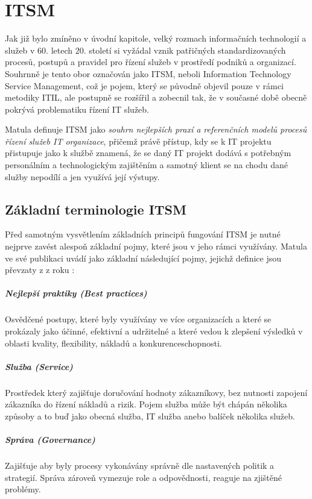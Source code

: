 \documentclass[
  digital,     %
  twoside,     %
  lof,         %
  lot,         %
]{fithesis4}
\begin{document}
\chapter{ITSM}
Jak již bylo zmíněno v úvodní kapitole, velký rozmach informačních technologií a služeb v 60. letech 20. století si vyžádal vznik patřičných standardizovaných procesů, postupů a pravidel pro řízení služeb v prostředí podniků a organizací. Souhrnně je tento obor označován jako ITSM, neboli Information Technology Service Management, což je pojem, který se původně objevil pouze v rámci metodiky ITIL, ale postupně se rozšířil a zobecnil tak, že v současné době obecně pokrývá problematiku řízení IT služeb.\parencite[s.~20]{Matula2017} 

Matula definuje ITSM jako \textit{souhrn nejlepších praxí a referenčních modelů procesů řízení služeb IT organizace}, přičemž právě přístup, kdy se k IT projektu přistupuje jako k službě znamená, že se daný IT projekt dodává s potřebným personálním a technologickým zajištěním a samotný klient se na chodu dané služby nepodílí a jen využívá její výstupy.\parencite[s.~20-22]{Matula2017}

\section{Základní terminologie ITSM}
Před samotným vysvětlením základních principů fungování ITSM je nutné nejprve zavést alespoň základní pojmy, které jsou v jeho rámci využívány. Matula ve své publikaci  uvádí jako základní následující pojmy, jejichž definice jsou převzaty z  z roku \citeyear{SyFvQA11lk1OaIec}:
\paragraph{Nejlepší praktiky (Best practices)}
Osvědčené postupy, které byly využívány ve více organizacích a které se prokázaly jako účinné, efektivní a udržitelné a které vedou k zlepšení výsledků v oblasti kvality, flexibility, nákladů a konkurenceschopnosti.
\paragraph{Služba (Service)}
Prostředek který zajišťuje doručování hodnoty zákazníkovy, bez nutnosti zapojení zákazníka do řízení nákladů a rizik. Pojem služba může být chápán několika způsoby a to buď jako obecná služba, IT služba anebo balíček několika služeb. 
\paragraph{Správa (Governance)}
Zajišťuje aby byly procesy vykonávány správně dle nastavených politik a strategií. Správa zároveň vymezuje role a odpovědnosti, reaguje na zjištěné problémy.
\end{document}
